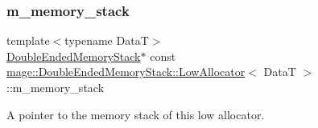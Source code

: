 \subsubsection{\texorpdfstring{m\+\_\+memory\+\_\+stack}{m\_memory\_stack}}
{\footnotesize\ttfamily template$<$typename DataT$>$ \\
\hyperlink{classmage_1_1_double_ended_memory_stack}{Double\+Ended\+Memory\+Stack}$\ast$ const \hyperlink{structmage_1_1_double_ended_memory_stack_1_1_low_allocator}{mage\+::\+Double\+Ended\+Memory\+Stack\+::\+Low\+Allocator}$<$ DataT $>$\+::m\+\_\+memory\+\_\+stack\hspace{0.3cm}{\ttfamily [private]}}

A pointer to the memory stack of this low allocator. 